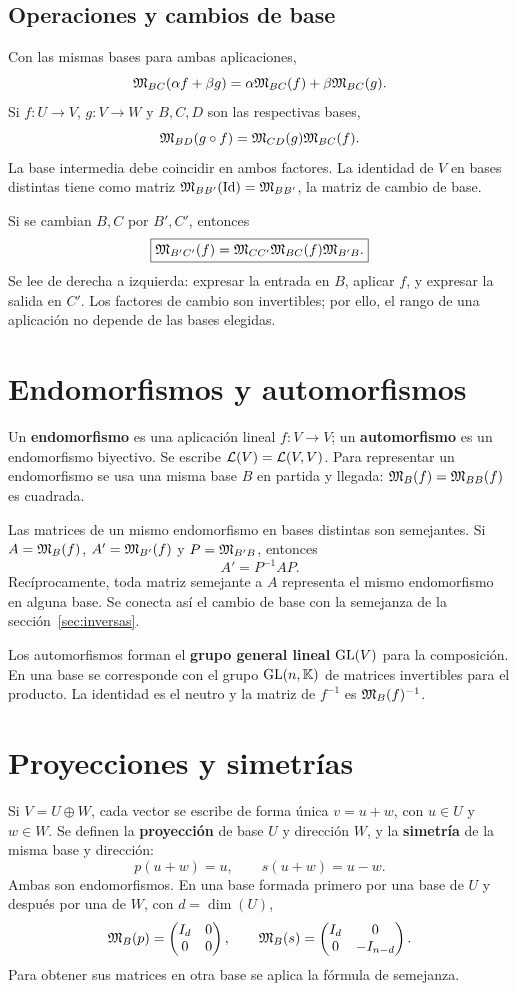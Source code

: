 \subsection*{Operaciones y cambios de base}

Con las mismas bases para ambas aplicaciones,
\[
 \mathfrak{M}_{BC}(\alpha f+\beta g)=\alpha\mathfrak{M}_{BC}(f)+\beta\mathfrak{M}_{BC}(g).
\]
Si $f:U\to V$, $g:V\to W$ y $B,C,D$ son las respectivas bases,
\[
 \mathfrak{M}_{BD}(g\circ f)=\mathfrak{M}_{CD}(g)\mathfrak{M}_{BC}(f).
\]
La base intermedia debe coincidir en ambos factores.
La identidad de $V$ en bases distintas tiene como matriz
$\mathfrak{M}_{BB'}(\mathrm{Id})=\mathfrak{M}_{BB'}$, la matriz de cambio de base.

Si se cambian $B,C$ por $B',C'$, entonces
\[
 \boxed{\mathfrak{M}_{B'C'}(f)=\mathfrak{M}_{CC'}\mathfrak{M}_{BC}(f)\mathfrak{M}_{B'B}.}
\]
Se lee de derecha a izquierda: expresar la entrada en $B$, aplicar $f$,
y expresar la salida en $C'$. Los factores de cambio son invertibles;
por ello, el rango de una aplicación no depende de las bases elegidas.

\section{Endomorfismos y automorfismos}
\label{sec:endomorfismos}

Un \textbf{endomorfismo} es una aplicación lineal $f:V\to V$;
un \textbf{automorfismo} es un endomorfismo biyectivo.
Se escribe $\mathcal{L}(V)=\mathcal{L}(V,V)$. Para representar un endomorfismo
se usa una misma base $B$ en partida y llegada:
$\mathfrak{M}_B(f)=\mathfrak{M}_{BB}(f)$ es cuadrada.

Las matrices de un mismo endomorfismo en bases distintas son semejantes.
Si $A=\mathfrak{M}_B(f)$, $A'=\mathfrak{M}_{B'}(f)$ y $P=\mathfrak{M}_{B'B}$, entonces
\[
 A'=P^{-1}AP.
\]
Recíprocamente, toda matriz semejante a $A$ representa el mismo
endomorfismo en alguna base. Se conecta así el cambio de base con la
semejanza de la sección~\ref{sec:inversas}.

Los automorfismos forman el \textbf{grupo general lineal} $\operatorname{GL}(V)$
para la composición. En una base se corresponde con el grupo
$\operatorname{GL}(n,\mathbb{K})$ de matrices invertibles para el producto.
La identidad es el neutro y la matriz de $f^{-1}$ es $\mathfrak{M}_B(f)^{-1}$.

\section{Proyecciones y simetrías}
\label{sec:proyecciones}

Si $V=U\oplus W$, cada vector se escribe de forma única $v=u+w$,
con $u\in U$ y $w\in W$. Se definen la \textbf{proyección} de base $U$
y dirección $W$, y la \textbf{simetría} de la misma base y dirección:
\[
 p(u+w)=u,\qquad s(u+w)=u-w.
\]
Ambas son endomorfismos. En una base formada primero por una base de $U$
y después por una de $W$, con $d=\dim(U)$,
\[
 \mathfrak{M}_B(p)=\begin{pmatrix}I_d&0\\0&0\end{pmatrix},\qquad
 \mathfrak{M}_B(s)=\begin{pmatrix}I_d&0\\0&-I_{n-d}\end{pmatrix}.
\]
Para obtener sus matrices en otra base se aplica la fórmula de semejanza.

